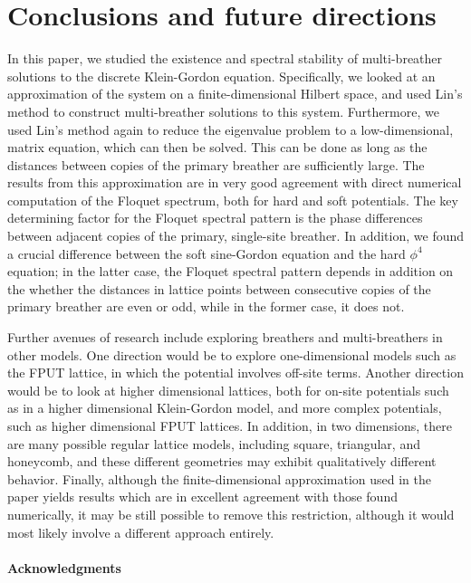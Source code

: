 \documentclass[12pt,reqno]{amsart}
\theoremstyle{definition}
\begin{document}
\section{Conclusions and future directions}\label{sec:conc}

In this paper, we studied the existence and spectral stability of multi-breather solutions to the discrete Klein-Gordon equation. Specifically, we looked at an approximation of the system on a finite-dimensional Hilbert space, and used Lin's method to construct multi-breather solutions to this system. Furthermore, we used Lin's method again to reduce the eigenvalue problem to a low-dimensional, matrix equation, which can then be solved. This can be done as long as the distances between copies of the primary breather are sufficiently large. The results from this approximation are in very good agreement with direct numerical computation of the Floquet spectrum, both for hard and soft potentials. The key determining factor for the Floquet spectral pattern is the phase differences between adjacent copies of the primary, single-site breather. In addition, we found a crucial difference between the soft sine-Gordon equation and the hard $\phi^4$ equation; in the latter case, the Floquet spectral pattern depends in addition on the whether the distances in lattice points between consecutive copies of the primary breather are even or odd, while in the former case, it does not. 

Further avenues of research include exploring breathers and multi-breathers in other models. One direction would be to explore one-dimensional models such as the FPUT lattice, in which the potential involves off-site terms. Another direction would be to look at higher dimensional lattices, both for on-site potentials such as in a higher dimensional Klein-Gordon model, and more complex potentials, such as higher dimensional FPUT lattices. In addition, in two dimensions, there are many possible regular lattice models, including square, triangular, and honeycomb, and these different geometries may exhibit qualitatively different behavior. Finally, although the finite-dimensional approximation used in the paper yields results which are in excellent agreement with those found numerically, it may be still possible to remove this restriction, although it would most likely involve a different approach entirely.

\vspace{0.5cm}

\paragraph{\textbf{Acknowledgments}}
\end{document}
